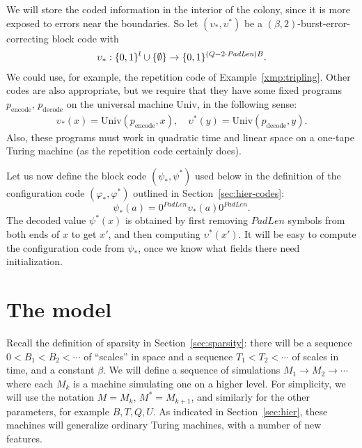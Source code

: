 \documentclass[11pt]{memoir}
\theoremstyle{definition} %
\def\B{B}
\def\U{U}
\newcommand{\Q}{Q}
\newcommand{\Tu}{T}
\newcommand{\decode}{\mathrm{decode}}
\newcommand{\encode}{\mathrm{encode}}
\newcommand{\PadLen}{\mathit{PadLen}}
\newcommand{\Un}{\mathrm{Univ}}
\begin{document}
We will store the coded information in the interior of the colony, since it is more exposed 
to errors near the boundaries.
So let \( (\upsilon_{*}, \upsilon^{*}) \) be a \( (\beta,2) \)-burst-error-correcting block code
with
\begin{align*}
  \upsilon_{*}: \{0,1\}^{l} \cup \set{\emptyset}
   \to\{0,1\}^{(\Q-2\cdot\PadLen)\B}.
\end{align*}
We could use, for example, the repetition code of Example~\ref{xmp:tripling}.
Other codes are also appropriate, but we require that they have some fixed
programs \( p_{\encode} \), \( p_{\decode} \)
on the universal machine \( \Un \), in the following sense:
 \begin{align*}
   \upsilon_{*}(x)=\Un(p_{\encode},x),\quad
   \upsilon^{*}(y)=\Un(p_{\decode}, y).
 \end{align*}
Also, these programs must work in quadratic time and linear space on a one-tape
Turing machine (as the repetition code certainly does).

Let us now define the block code \( (\psi_{*}, \psi^{*}) \) used below in the
definition of the configuration code \( (\varphi_{*}, \varphi^{*}) \)  
outlined in Section~\ref{sec:hier-codes}:
\begin{equation}\label{eq:psi}
   \psi_{*}(a)  = 0^{\PadLen}\upsilon_{*}(a)0^{\PadLen}.
\end{equation}
The decoded value \( \psi^{*}(x) \) is obtained by first removing \( \PadLen \)
symbols from both ends of \( x \) to get \( x' \), and then computing \(
\upsilon^{*}(x') \).
 It will be easy to compute the configuration code from \( \psi_{*} \),
once we know what fields there need initialization.


\section{The model}\label{sec:model}

Recall the definition of sparsity in Section~\ref{sec:sparsity}: there will be 
a sequence \( 0<\B_{1}<\B_{2}<\dotsm \) of ``scales'' in space and a sequence
\( \Tu_{1}<\Tu_{2}<\dotsm \) of scales in time, and a constant \( \beta \).
We will define a sequence of simulations \( M_{1}\to M_{2}\to\dotsm \) where
each \( M_{k} \) is a machine simulating one on a higher level.
For simplicity, we will use the notation \( M=M_{k} \), \( M^{*}=M_{k+1} \),
and similarly for the other parameters, for example \( \B,\Tu, \Q, \U \).
As indicated in Section~\ref{sec:hier}, these machines will generalize
ordinary Turing machines, with a number of new features.
\end{document}
